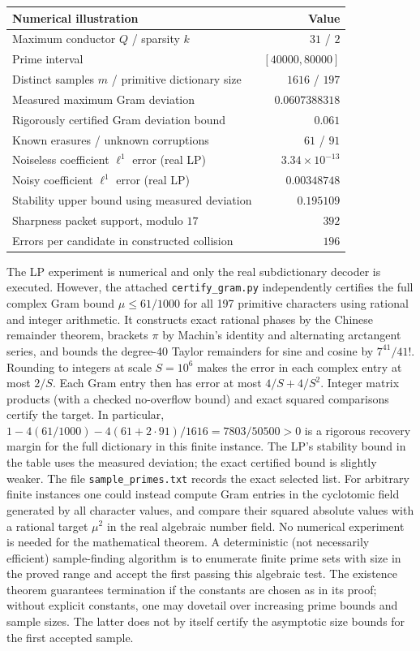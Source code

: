 \documentclass[11pt]{article}
\theoremstyle{remark}\newtheorem{remark}[theorem]{Remark}
\begin{document}
\begin{center}
\begin{tabular}{@{}lr@{}}
\toprule
Numerical illustration & Value\\\midrule
Maximum conductor $Q$ / sparsity $k$ & $31$ / $2$\\
Prime interval & $[40000,80000]$\\
Distinct samples $m$ / primitive dictionary size & $1616$ / $197$\\
Measured maximum Gram deviation & $0.0607388318$\\
Rigorously certified Gram deviation bound & $0.061$\\
Known erasures / unknown corruptions & $61$ / $91$\\
Noiseless coefficient $\ell^1$ error (real LP) & $3.34\times10^{-13}$\\
Noisy coefficient $\ell^1$ error (real LP) & $0.00348748$\\
Stability upper bound using measured deviation & $0.195109$\\
Sharpness packet support, modulo $17$ & $392$\\
Errors per candidate in constructed collision & $196$\\\bottomrule
\end{tabular}
\end{center}
The LP experiment is numerical and only the real subdictionary decoder is executed. However, the attached \texttt{certify\_gram.py} independently certifies the full complex Gram bound $\mu\le61/1000$ for all 197 primitive characters using rational and integer arithmetic. It constructs exact rational phases by the Chinese remainder theorem, brackets $\pi$ by Machin's identity and alternating arctangent series, and bounds the degree-40 Taylor remainders for sine and cosine by $7^{41}/41!$. Rounding to integers at scale $S=10^6$ makes the error in each complex entry at most $2/S$. Each Gram entry then has error at most $4/S+4/S^2$. Integer matrix products (with a checked no-overflow bound) and exact squared comparisons certify the target. In particular, $1-4(61/1000)-4(61+2\cdot91)/1616=7803/50500>0$ is a rigorous recovery margin for the full dictionary in this finite instance. The LP's stability bound in the table uses the measured deviation; the exact certified bound is slightly weaker. The file \texttt{sample\_primes.txt} records the exact selected list. For arbitrary finite instances one could instead compute Gram entries in the cyclotomic field generated by all character values, and compare their squared absolute values with a rational target $\mu^2$ in the real algebraic number field. No numerical experiment is needed for the mathematical theorem. A deterministic (not necessarily efficient) sample-finding algorithm is to enumerate finite prime sets with size in the proved range and accept the first passing this algebraic test. The existence theorem guarantees termination if the constants are chosen as in its proof; without explicit constants, one may dovetail over increasing prime bounds and sample sizes. The latter does not by itself certify the asymptotic size bounds for the first accepted sample.
\end{document}
